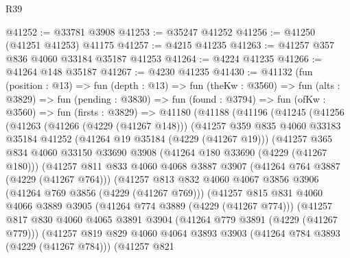 \begin{lexlean}{R39}
\begin{coremodule}
@41252 := @33781 @3908
@41253 := @35247 @41252
@41256 := @41250 (@41251 @41253) @41175
@41257 := @4215 @41235
@41263 := @41257 @357 @836 @4060 @33184 @35187 @41253
@41264 := @4224 @41235
@41266 := @41264 @148 @35187
@41267 := @4230 @41235
@41430 := @41132
    (fun (position : @13) =>
    fun (depth : @13) =>
    fun (theKw : @3560) =>
    fun (alts : @3829) =>
    fun (pending : @3830) =>
    fun (found : @3794) =>
    fun (ofKw : @3560) =>
    fun (firsts : @3829) =>
    @41180
      (@41188
        (@41196
          (@41245
            (@41256
              (@41263
                (@41266 (@4229 (@41267 @148)))
                (@41257
                  @359
                  @835
                  @4060
                  @33183
                  @35184
                  @41252
                  (@41264 @19 @35184 (@4229 (@41267 @19)))
                  (@41257
                    @365
                    @834
                    @4060
                    @33150
                    @33690
                    @3908
                    (@41264 @180 @33690 (@4229 (@41267 @180)))
                    (@41257
                      @811
                      @833
                      @4060
                      @4068
                      @3887
                      @3907
                      (@41264 @764 @3887 (@4229 (@41267 @764)))
                      (@41257
                        @813
                        @832
                        @4060
                        @4067
                        @3856
                        @3906
                        (@41264 @769 @3856 (@4229 (@41267 @769)))
                        (@41257
                          @815
                          @831
                          @4060
                          @4066
                          @3889
                          @3905
                          (@41264 @774 @3889 (@4229 (@41267 @774)))
                          (@41257
                            @817
                            @830
                            @4060
                            @4065
                            @3891
                            @3904
                            (@41264 @779 @3891 (@4229 (@41267 @779)))
                            (@41257
                              @819
                              @829
                              @4060
                              @4064
                              @3893
                              @3903
                              (@41264 @784 @3893 (@4229 (@41267 @784)))
                              (@41257
                                @821

\end{coremodule}
\end{lexlean}
